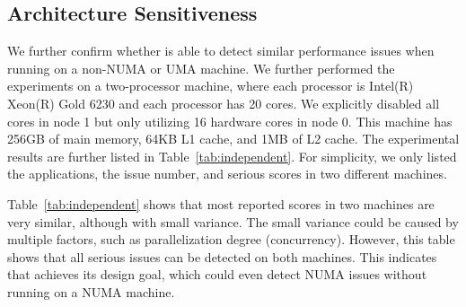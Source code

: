 
\subsection{Architecture Sensitiveness}
\label{sec:archindependent}

We further confirm whether \NP{} is able to detect similar performance issues when running on a non-NUMA or UMA machine. We further performed the experiments on a two-processor machine, where each processor is Intel(R) Xeon(R) Gold 6230 and each processor has 20 cores. We explicitly disabled all cores in node 1 but only utilizing 16 hardware cores in node 0. This machine has 256GB of main memory, 64KB L1 cache, and 1MB of L2 cache. The experimental results are further listed in Table~\ref{tab:independent}. For simplicity, we only listed the applications, the issue number, and serious scores in two different machines. 

Table~\ref{tab:independent} shows that most reported scores in two machines are very similar, although with small variance. The small variance could be caused by multiple factors, such as parallelization degree (concurrency). However, this table shows that all serious issues can be detected on both machines. This indicates that \NP{}  achieves its design goal, which could even detect NUMA issues without running on a NUMA machine. 


    


    
